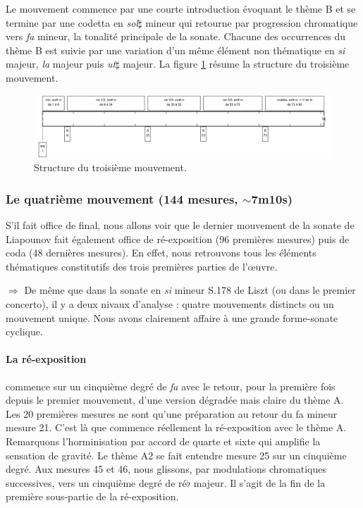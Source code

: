 Le mouvement commence par une courte introduction évoquant le thème B et se termine par une codetta en \emph{sol}$\sharp$ mineur qui retourne par progression chromatique vers \emph{fa} mineur, la tonalité principale de la sonate. Chacune des occurrences du thème B est suivie par une variation d'un même élément non thématique en \emph{si} majeur, \emph{la} majeur puis \emph{ut}$\sharp$ majeur. La figure \ref{schema-3} résume la structure du troisième mouvement.

\begin{figure}[!ht]
  \begin{bigcenter}
    \includegraphics[width=17.5cm, keepaspectratio]{frise-mvt3.png}
  \end{bigcenter}
  \caption{\label{schema-3}Structure du troisième mouvement.}
\end{figure}

\newpage

\subsubsection*{Le quatrième mouvement (144 mesures, $\sim$7m10s)}

S'il fait office de final, nous allons voir que le dernier mouvement de la sonate de Liapounov fait également office de ré-exposition (96 premières mesures) puis de coda (48 dernières mesures). En effet, nous retrouvons tous les éléments thématiques constitutifs des trois premières parties de l'œuvre.

$\Rightarrow$ De même que dans la sonate en \emph{si} mineur S.178 de Liszt (ou dans le premier concerto), il y a deux nivaux d'analyse : quatre mouvements distincts ou un mouvement unique. Nous avons clairement affaire à une grande forme-sonate cyclique.

\paragraph{La ré-exposition} commence sur un cinquième degré de \emph{fa} avec le retour, pour la première fois depuis le premier mouvement, d'une version dégradée mais claire du thème A. Les 20 premières mesures ne sont qu'une préparation au retour du fa mineur mesure 21. C'est là que commence réellement la ré-exposition avec le thème A. Remarquons l'horminisation par accord de quarte et sixte qui amplifie la sensation de gravité. Le thème A2 se fait entendre mesure 25 sur un cinquième degré. Aux mesures 45 et 46, nous glissons, par modulations chromatiques successives, vers un cinquième degré de ré$\flat$ majeur. Il s'agit de la fin de la première sous-partie de la ré-exposition.

